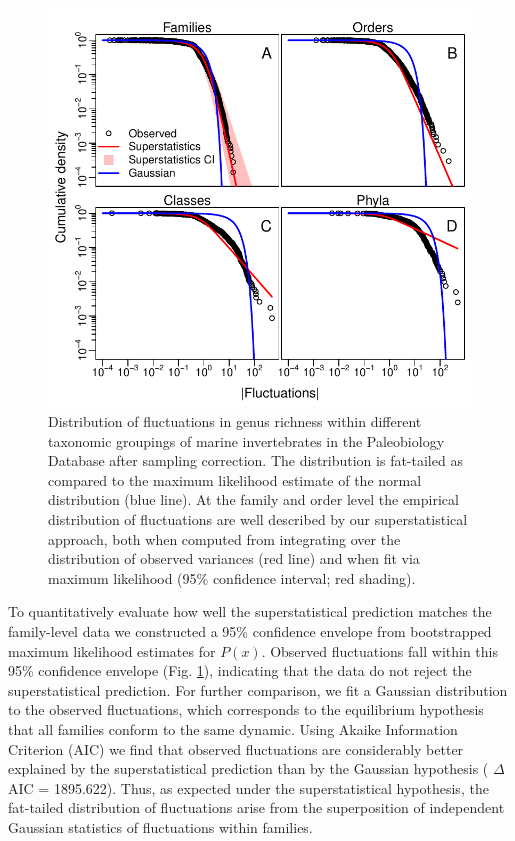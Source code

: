 \documentclass[12pt]{article}
\let\citep=\cite
\begin{document}
\begin{figure}[!h]
  \centering
  \includegraphics[scale=1]{../../fig_Px.pdf} 
  \caption[Clade-level distribution of richness
  fluctuations]{Distribution of fluctuations in genus richness within
    different taxonomic groupings of marine invertebrates in the
    Paleobiology Database \citep{alroy08} after sampling
    correction. The distribution is fat-tailed as compared to the
    maximum likelihood estimate of the normal distribution (blue
    line).  At the family and order level the empirical distribution
    of fluctuations are well described by our superstatistical
    approach, both when computed from integrating over the
    distribution of observed variances (red line) and when fit via
    maximum likelihood (95\% confidence interval; red shading).}
  \label{fig:Px}
\end{figure}

To quantitatively evaluate how well the superstatistical prediction
matches the family-level data we constructed a 95\% confidence
envelope from bootstrapped maximum likelihood estimates for
$P(x)$. Observed fluctuations fall within this 95\% confidence
envelope (Fig. \ref{fig:Px}), indicating that the data do not reject
the superstatistical prediction. For further comparison, we fit a
Gaussian distribution to the observed fluctuations, which corresponds
to the equilibrium hypothesis that all families conform to the same
dynamic. Using Akaike Information Criterion (AIC) we find that
observed fluctuations are considerably better explained by the
superstatistical prediction than by the Gaussian hypothesis ({\small
  $\Delta$}AIC = 1895.622). Thus, as expected under the
superstatistical hypothesis, the fat-tailed distribution of
fluctuations arise from the superposition of independent Gaussian
statistics of fluctuations within families.
\end{document}

